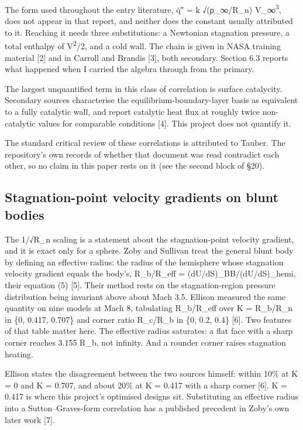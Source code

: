\documentclass[
  a4paper,
  11pt]{article}
\begin{document}
The form used throughout the entry literature, \.{q}{\symfont ″} = k
√(ρ\_∞/R\_n) V\_∞\textsuperscript{3}, does not appear in that report,
and neither does the constant usually attributed to it. Reaching it
needs three substitutions: a Newtonian stagnation pressure, a total
enthalpy of V\textsuperscript{2}/2, and a cold wall. The chain is given
in NASA training material {[}2{]} and in Carroll and Brandis {[}3{]},
both secondary. Section 6.3 reports what happened when I carried the
algebra through from the primary.

The largest unquantified term in this class of correlation is surface
catalycity. Secondary sources characterise the
equilibrium-boundary-layer basis as equivalent to a fully catalytic
wall, and report catalytic heat flux at roughly twice non-catalytic
values for comparable conditions {[}4{]}. This project does not quantify
it.

The standard critical review of these correlations is attributed to
Tauber. The repository's own records of whether that document was read
contradict each other, so no claim in this paper rests on it (see the
second block of §20).

\subsection{Stagnation-point velocity gradients on blunt bodies}

The 1/√R\_n scaling is a statement about the stagnation-point velocity
gradient, and it is exact only for a sphere. Zoby and Sullivan treat the
general blunt body by defining an effective radius: the radius of the
hemisphere whose stagnation velocity gradient equals the body's,
R\_b/R\_eff = (dU/dS)\_BB/(dU/dS)\_hemi, their equation (5) {[}5{]}.
Their method rests on the stagnation-region pressure distribution being
invariant above about Mach 3.5. Ellison measured the same quantity on
nine models at Mach 8, tabulating R\_b/R\_eff over K = R\_b/R\_n in \{0,
0.417, 0.707\} and corner ratio R\_c/R\_b in \{0, 0.2, 0.4\} {[}6{]}.
Two features of that table matter here. The effective radius saturates:
a flat face with a sharp corner reaches 3.155 R\_b, not infinity. And a
rounder corner raises stagnation heating.

Ellison states the disagreement between the two sources himself: within
10\% at K = 0 and K = 0.707, and about 20\% at K = 0.417 with a sharp
corner {[}6{]}. K = 0.417 is where this project's optimised designs sit.
Substituting an effective radius into a Sutton--Graves-form correlation
has a published precedent in Zoby's own later work {[}7{]}.
\end{document}
